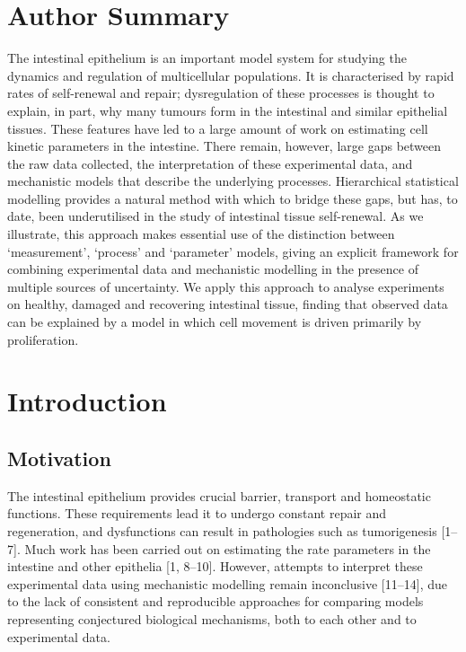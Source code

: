 \documentclass[10pt,letterpaper]{article}
\begin{document}
\section{Author Summary}\label{author-summary}

The intestinal epithelium is an important model system for studying the
dynamics and regulation of multicellular populations. It is
characterised by rapid rates of self-renewal and repair; dysregulation
of these processes is thought to explain, in part, why many tumours form
in the intestinal and similar epithelial tissues. These features have
led to a large amount of work on estimating cell kinetic parameters in
the intestine. There remain, however, large gaps between the raw data
collected, the interpretation of these experimental data, and
mechanistic models that describe the underlying processes. Hierarchical
statistical modelling provides a natural method with which to bridge
these gaps, but has, to date, been underutilised in the study of
intestinal tissue self-renewal. As we illustrate, this approach makes
essential use of the distinction between `measurement', `process' and
`parameter' models, giving an explicit framework for combining
experimental data and mechanistic modelling in the presence of multiple
sources of uncertainty. We apply this approach to analyse experiments on
healthy, damaged and recovering intestinal tissue, finding that observed
data can be explained by a model in which cell movement is driven
primarily by proliferation.

\linenumbers

\section{Introduction}\label{introduction}

\subsection{Motivation}\label{motivation}

The intestinal epithelium provides crucial barrier, transport and
homeostatic functions. These requirements lead it to undergo constant
repair and regeneration, and dysfunctions can result in pathologies such
as tumorigenesis {[}1--7{]}. Much work has been carried out on
estimating the rate parameters in the intestine and other epithelia
{[}1, 8--10{]}. However, attempts to interpret these experimental data
using mechanistic modelling remain inconclusive {[}11--14{]}, due to the
lack of consistent and reproducible approaches for comparing models
representing conjectured biological mechanisms, both to each other and
to experimental data.
\end{document}

